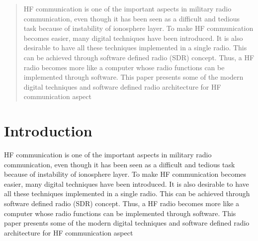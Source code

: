\documentclass[conference]{IEEEtran}
\begin{document}
\maketitle


\begin{abstract}
HF communication is one of the important aspects in military radio communication, even though it has been seen as a difficult and tedious task because of instability of ionosphere layer. To make HF communication becomes easier, many digital techniques have been introduced. It is also desirable to have all these techniques implemented in a single radio. This can be achieved through software defined radio (SDR) concept. Thus, a HF radio becomes more like a computer whose radio functions can be implemented through software. This paper presents some of the modern digital techniques and software defined radio architecture for HF communication aspect
\end{abstract}





%
\IEEEpeerreviewmaketitle



\section{Introduction}
HF communication is one of the important aspects in military radio communication, even though it has been seen as a difficult and tedious task because of instability of ionosphere layer. To make HF communication becomes easier, many digital techniques have been introduced. It is also desirable to have all these techniques implemented in a single radio. This can be achieved through software defined radio (SDR) concept. Thus, a HF radio becomes more like a computer whose radio functions can be implemented through software. This paper presents some of the modern digital techniques and software defined radio architecture for HF communication aspect
\end{document}

